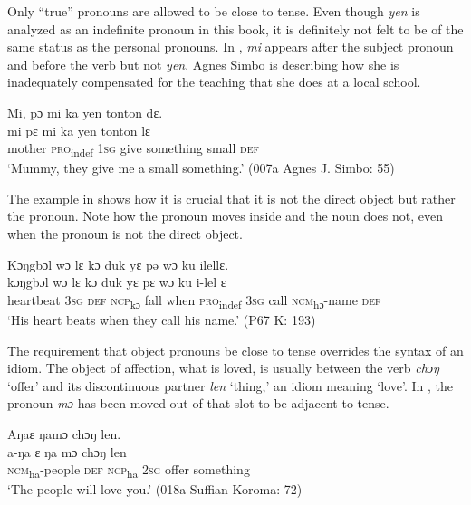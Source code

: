 Only “true” pronouns are allowed to be close to tense. Even though \textit{yen} is analyzed as an indefinite pronoun in this book, it is definitely not felt to be of the same status as the personal pronouns. In , \textit{mi} appears after the subject pronoun and before the verb but not \textit{yen}. Agnes Simbo is describing how she is inadequately compensated for the teaching that she does at a local school.

\ea%
    \label{ex:217}
    Mi, pɔ mi ka yen tonton dɛ.\\
    \gll mi        pɛ      mi    ka    yen      tonton  lɛ\\
    mother    \textsc{pro}\textsubscript{indef}  \textsc{1sg}  give  something  small    \textsc{def}\\
    \glt ‘Mummy, they give me a small something.' (007a Agnes J. Simbo: 55)
\z

The example in  shows how it is crucial that it is not the direct object but rather the pronoun. Note how the pronoun moves inside and the noun does not, even when the pronoun is not the direct object.

\ea%
    \label{ex:218}
    Kɔŋgbɔl wɔ lɛ kɔ duk yɛ pə wɔ ku ilellɛ.\\
    \gll kɔŋgbɔl    wɔ    lɛ    kɔ      duk  yɛ      pɛ      wɔ    ku    i-lel        ɛ\\
    heartbeat  \textsc{3sg}  \textsc{def}  \textsc{ncp}\textsubscript{kɔ}    fall  when    \textsc{pro}\textsubscript{indef}  \textsc{3sg}  call  \textsc{ncm}\textsubscript{hɔ}{}-name  \textsc{def}\\
    \glt ‘His heart beats when they call his name.' (P67 K: 193)
\z

The requirement that object pronouns be close to tense overrides the syntax of an idiom. The object of affection, what is loved, is usually between the verb \textit{chɔŋ} ‘offer' and its discontinuous partner \textit{len} ‘thing,' an idiom meaning ‘love'. In , the pronoun \textit{mɔ} has been moved out of that slot to be adjacent to tense.

\ea%
    \label{ex:219}
    Aŋaɛ   ŋamɔ chɔŋ len.\\
    \gll a-ŋa        ɛ    ŋa    mɔ  chɔŋ  len\\
    \textsc{ncm}\textsubscript{ha}{}-people  \textsc{def}  \textsc{ncp}\textsubscript{ha}  \textsc{2sg}  offer  something\\
    \glt ‘The people will love you.' (018a Suffian Koroma: 72)
\z

